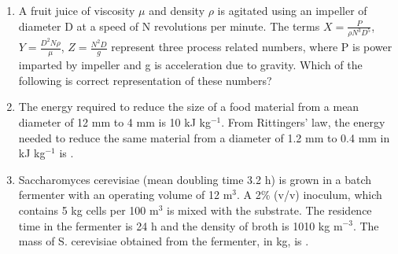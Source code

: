 \documentclass[a4paper,10pt]{article}
\begin{document}
\begin{enumerate}
    \hfill{}
    \begin{enumerate}
    \end{enumerate}

    \item A fruit juice of viscosity $\mu$ and density $\rho$ is agitated using an impeller of diameter D at a speed of N revolutions per minute. The terms $X = \frac{P}{\rho N^3 D^5}$, $Y = \frac{D^2 N \rho}{\mu}$, $Z = \frac{N^2 D}{g}$ represent three process related numbers, where P is power imparted by impeller and g is acceleration due to gravity. Which of the following is correct representation of these numbers?
    
    \hfill{}
    \begin{enumerate}
    \end{enumerate}
    
    \item The energy required to reduce the size of a food material from a mean diameter of 12 mm to 4 mm is 10 kJ kg$^{-1}$. From Rittingers' law, the energy needed to reduce the same material from a diameter of 1.2 mm to 0.4 mm in kJ kg$^{-1}$ is \underline{\hspace{2cm}}.
    
    \hfill{}
    
    \item Saccharomyces cerevisiae (mean doubling time 3.2 h) is grown in a batch fermenter with an operating volume of 12 m$^3$. A 2\% (v/v) inoculum, which contains 5 kg cells per 100 m$^3$ is mixed with the substrate. The residence time in the fermenter is 24 h and the density of broth is 1010 kg m$^{-3}$. The mass of S. cerevisiae obtained from the fermenter, in kg, is \underline{\hspace{2cm}}.
    

\end{enumerate}
\end{document}
